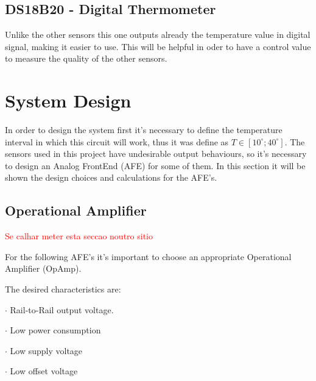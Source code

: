 \documentclass[12pt]{article}
\begin{document}
\subsection{DS18B20 - Digital Thermometer}

    Unlike the other sensors this one outputs already the temperature value in digital signal, making it easier to use. This will be helpful in oder to have a control value to measure the quality of the other sensors.

\newpage
\section{System Design}

    In order to design the system first it's necessary to define the temperature interval in which this circuit will work, thus it was define as $T \in [ 10^{\circ}; 40^{\circ} ]$. 
    The sensors used in this project have undesirable output behaviours, so it's necessary to design an Analog FrontEnd (AFE) for some of them. In this section it will be shown the design choices and calculations for the AFE's.

\subsection{Operational Amplifier}

    \textcolor{red}{Se calhar meter esta seccao noutro sitio}

    For the following AFE's it's important to choose an appropriate Operational Amplifier (OpAmp). 

    The desired characteristics are:

    $\cdot$ Rail-to-Rail output voltage.
    
    $\cdot$ Low power consumption
    
    $\cdot$ Low supply voltage

    $\cdot$ Low offset voltage
\end{document}
